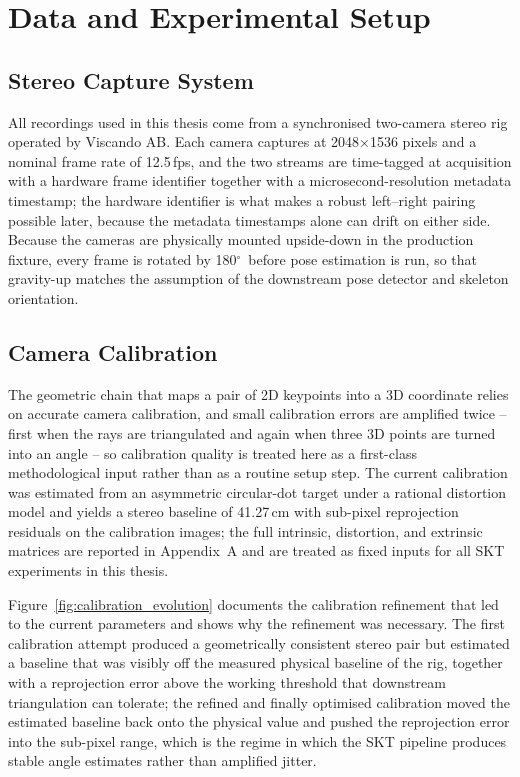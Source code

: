 \documentclass[12pt,a4paper]{article}
\newcommand{\degr}{\ensuremath{^\circ}}
\begin{document}
\clearpage
\section{Data and Experimental Setup}
\label{sec:data_setup}

\subsection{Stereo Capture System}

All recordings used in this thesis come from a synchronised two-camera
stereo rig operated by Viscando AB.
Each camera captures at 2048$\times$1536 pixels and a nominal frame rate of
12.5\,fps, and the two streams are time-tagged at acquisition with a
hardware frame identifier together with a microsecond-resolution metadata
timestamp; the hardware identifier is what makes a robust left--right pairing
possible later, because the metadata timestamps alone can drift on either
side.
Because the cameras are physically mounted upside-down in the production
fixture, every frame is rotated by 180\degr\ before pose estimation is run,
so that gravity-up matches the assumption of the downstream pose detector
and skeleton orientation.

\subsection{Camera Calibration}

The geometric chain that maps a pair of 2D keypoints into a 3D coordinate
relies on accurate camera calibration, and small calibration errors are
amplified twice -- first when the rays are triangulated and again when three
3D points are turned into an angle -- so calibration quality is treated here
as a first-class methodological input rather than as a routine setup step.
The current calibration was estimated from an asymmetric circular-dot
target under a rational distortion model and yields a stereo baseline of
41.27\,cm with sub-pixel reprojection residuals on the calibration images;
the full intrinsic, distortion, and extrinsic matrices are reported in
Appendix~A and are treated as fixed inputs for all SKT
experiments in this thesis.

Figure~\ref{fig:calibration_evolution} documents the calibration refinement
that led to the current parameters and shows why the refinement was
necessary.
The first calibration attempt produced a geometrically consistent stereo
pair but estimated a baseline that was visibly off the measured physical
baseline of the rig, together with a reprojection error above the
working threshold that downstream triangulation can tolerate; the refined
and finally optimised calibration moved the estimated baseline back onto
the physical value and pushed the reprojection error into the sub-pixel
range, which is the regime in which the SKT pipeline produces stable
angle estimates rather than amplified jitter.
\end{document}
